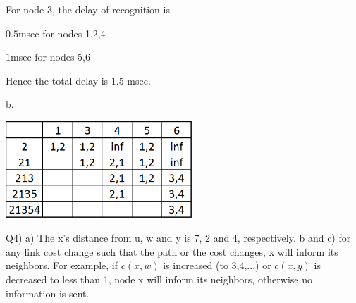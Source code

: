 \documentclass[10pt,letterpaper]{article}
\begin{document}
For node $3$, the delay of recognition is

$0.5$msec for nodes 1,2,4

$1$msec for nodes 5,6

Hence the total delay is $1.5$ msec.

b.
\begin{center}
\includegraphics[width=70mm]{Table.png}
\end{center}

Q4) a) The x's distance from u, w and y is 7, 2 and 4, respectively.
\newline\newline
b and c) for any link cost change such that the path or the cost changes, x will inform its neighbors. For example, if $c(x,w)$ is increased (to 3,4,...) or $c(x,y)$ is decreased to less than 1, node x will inform its neighbors, otherwise no information is sent.
\end{document}
